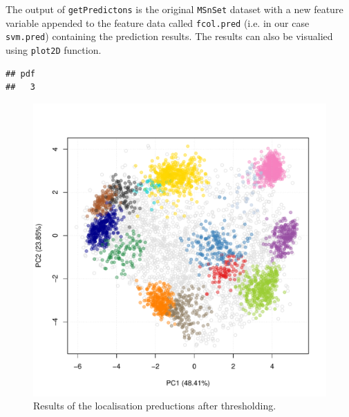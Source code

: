 The output of \texttt{getPredictons} is the original \texttt{MSnSet}
dataset with a new feature variable appended to the feature data
called \texttt{fcol.pred} (i.e. in our case \texttt{svm.pred})
containing the prediction results. The results can also be visualied
using \texttt{plot2D} function.

\begin{knitrout}
\color{fgcolor}\begin{kframe}
\begin{alltt}
\hlstd{()}
\end{alltt}
\begin{verbatim}
## pdf 
##   3
\end{verbatim}
\end{kframe}
\end{knitrout}

\begin{figure}[!ht]
    \centering
\begin{knitrout}
\color{fgcolor}\begin{kframe}
\begin{alltt}
  \hlstd{=} \hlstd{)}
\end{alltt}
\end{kframe}
\includegraphics[width=.8\textwidth]{figure/plotres-1} 

\end{knitrout}
  \caption{Results of the localisation preductions after thresholding.}
  \label{fig:plotres}
\end{figure}


